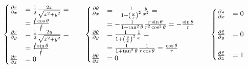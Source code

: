 \documentclass
[
a4paper,                      %
twoside,					  %
12pt,                         %
abstract,		      %
fleqn,                        %
]
{scrartcl} %
\begin{document}
\begin{description}
\begin{equation}
\begin{cases}
\frac{\partial r}{\partial x}&=\frac{1}{2}\frac{2x}{\sqrt{x^{2}+y^{2}}}=\\&=\frac{\cancel{r}\cos{\theta}}{\cancel{r}}\\
\frac{\partial r}{\partial y}&=\frac{1}{2}\frac{2y}{\sqrt{x^{2}+y^{2}}}=\\&=\frac{\cancel{r}\sin{\theta}}{\cancel{r}}\\
\frac{\partial r}{\partial z}&=0\\
\end{cases}\qquad\begin{cases}
\frac{\partial \theta}{\partial x}&=-\frac{1}{1+\left(\frac{y}{x}\right)^{2}}\frac{y}{x^{2}}=\\&=-\frac{1}{1+\tan^{2}{\theta}}\frac{r\sin{\theta}}{r^{2}\cos^{2}{\theta}}=-\frac{\sin{\theta}}{r}\\
\frac{\partial \theta}{\partial y}&=\frac{1}{1+\left(\frac{y}{x}\right)^{2}}\frac{1}{x}=\\&=\frac{1}{1+\tan^{2}{\theta}}\frac{1}{r\cos{\theta}}=\frac{\cos{\theta}}{r}\\
\frac{\partial \theta}{\partial z}&=0\\
\end{cases}\qquad\begin{cases}
\frac{\partial \tilde{z}}{\partial x}&=0\\&\\
\frac{\partial \tilde{z}}{\partial y}&=0\\&\\
\frac{\partial \tilde{z}}{\partial z}&=1\\
\end{cases}
\end{equation}


\end{description}
\end{document}
